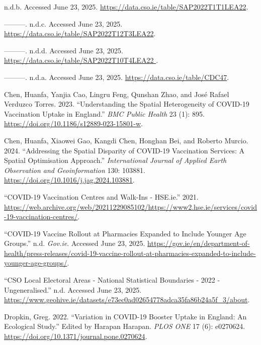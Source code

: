 \documentclass{article}
\newlength{\cslhangindent}
\newenvironment{CSLReferences}[2] %
 {\begin{list}{}{%
  \setlength{\itemindent}{0pt}
  \setlength{\leftmargin}{0pt}
  \setlength{\parsep}{0pt}
  \ifodd #1
   \setlength{\leftmargin}{\cslhangindent}
   \setlength{\itemindent}{-1\cslhangindent}
  \fi
  \setlength{\itemsep}{#2\baselineskip}}}
 {\end{list}}
\begin{document}
\label{refs}
\begin{CSLReferences}{1}{0}
n.d.b. Accessed June 23, 2025.
\url{https://data.cso.ie/table/SAP2022T1T1LEA22}.

---------. n.d.c. Accessed June 23, 2025.
\url{https://data.cso.ie/table/SAP2022T12T3LEA22}.

---------. n.d.d. Accessed June 23, 2025.
\href{https://data.cso.ie/table/SAP2022T10T4LEA22\%20}{https://data.cso.ie/table/SAP2022T10T4LEA22
}.

---------. n.d.a. Accessed June 23, 2025.
\url{https://data.cso.ie/table/CDC47}.

Chen, Huanfa, Yanjia Cao, Lingru Feng, Qunshan Zhao, and José Rafael
Verduzco Torres. 2023. {``Understanding the Spatial Heterogeneity of
{COVID}-19 Vaccination Uptake in {England}.''} \emph{BMC Public Health}
23 (1): 895. \url{https://doi.org/10.1186/s12889-023-15801-w}.

Chen, Huanfa, Xiaowei Gao, Kangdi Chen, Honghan Bei, and Roberto Murcio.
2024. {``Addressing the Spatial Disparity of COVID-19 Vaccination
Services: A Spatial Optimisation Approach.''} \emph{International
Journal of Applied Earth Observation and Geoinformation} 130: 103881.
\url{https://doi.org/10.1016/j.jag.2024.103881}.

{``{COVID}-19 Vaccination Centres and Walk-Ins - {HSE}.ie.''} 2021.
\url{https://web.archive.org/web/20211229085102/https://www2.hse.ie/services/covid-19-vaccination-centres/}.

{``{COVID}-19 {Vaccine} Rollout at Pharmacies Expanded to Include
Younger Age Groups.''} n.d. \emph{Gov.ie}. Accessed June 23, 2025.
\url{https://gov.ie/en/department-of-health/press-releases/covid-19-vaccine-rollout-at-pharmacies-expanded-to-include-younger-age-groups/}.

{``{CSO} {Local} {Electoral} {Areas} - {National} {Statistical}
{Boundaries} - 2022 - {Ungeneralised}.''} n.d. Accessed June 23, 2025.
\url{https://www.geohive.ie/datasets/e73ec0ad02654778adca35fa86b24a5f_3/about}.

Dropkin, Greg. 2022. {``Variation in {COVID}-19 Booster Uptake in
{England}: {An} Ecological Study.''} Edited by Harapan Harapan.
\emph{PLOS ONE} 17 (6): e0270624.
\url{https://doi.org/10.1371/journal.pone.0270624}.


\end{CSLReferences}
\end{document}
